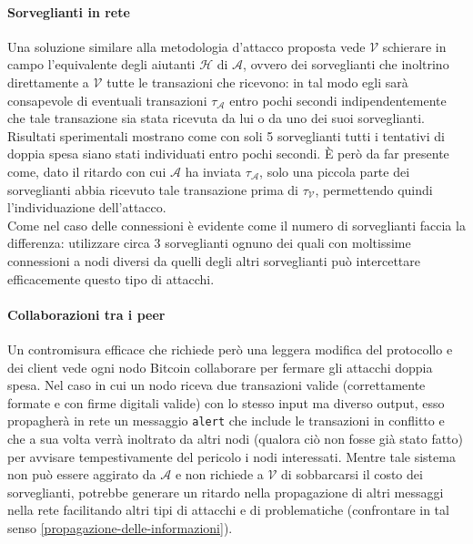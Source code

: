 \paragraph{Sorveglianti in rete}

Una soluzione similare alla metodologia d'attacco proposta vede $\mathcal{V}$ schierare in campo l'equivalente degli aiutanti $\mathcal{H}$ di $\mathcal{A}$, ovvero dei sorveglianti che inoltrino direttamente a $\mathcal{V}$ tutte le transazioni che ricevono: in tal modo egli sarà consapevole di eventuali transazioni $\tau_\mathcal{A}$ entro pochi secondi indipendentemente che tale transazione sia stata ricevuta da lui o da uno dei suoi sorveglianti. Risultati sperimentali mostrano come con soli 5 sorveglianti tutti i tentativi di doppia spesa siano stati individuati entro pochi secondi. È però da far presente come, dato il ritardo con cui $\mathcal{A}$ ha inviata $\tau_\mathcal{A}$, solo una piccola parte dei sorveglianti abbia ricevuto tale transazione prima di $\tau_\mathcal{V}$, permettendo quindi l'individuazione dell'attacco.\\
Come nel caso delle connessioni è evidente come il numero di sorveglianti faccia la differenza: utilizzare circa 3 sorveglianti ognuno dei quali con moltissime connessioni a nodi diversi da quelli degli altri sorveglianti può intercettare efficacemente questo tipo di attacchi.

\paragraph{Collaborazioni tra i peer}

Un contromisura efficace che richiede però una leggera modifica del protocollo e dei client vede ogni nodo Bitcoin collaborare per fermare gli attacchi doppia spesa. Nel caso in cui un nodo riceva due transazioni valide (correttamente formate e con firme digitali valide) con lo stesso input ma diverso output, esso propagherà in rete un messaggio \verb|alert| che include le transazioni in conflitto e che a sua volta verrà inoltrato da altri nodi (qualora ciò non fosse già stato fatto) per avvisare tempestivamente del pericolo i nodi interessati. Mentre tale sistema non può essere aggirato da $\mathcal{A}$ e non richiede a $\mathcal{V}$ di sobbarcarsi il costo dei sorveglianti, potrebbe generare un ritardo nella propagazione di altri messaggi nella rete facilitando altri tipi di attacchi e di problematiche (confrontare in tal senso \ref{propagazione-delle-informazioni}).

